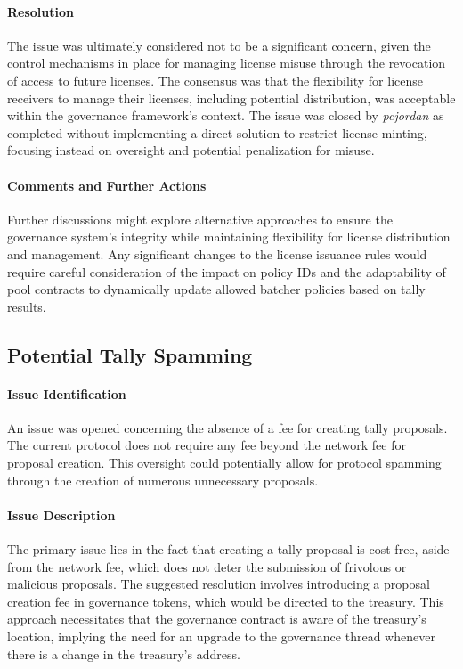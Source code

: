 \documentclass[11pt]{article}
\begin{document}
\paragraph{Resolution}
The issue was ultimately considered not to be a significant concern, given the control mechanisms in place for managing license misuse through the revocation of access to future licenses. The consensus was that the flexibility for license receivers to manage their licenses, including potential distribution, was acceptable within the governance framework's context. The issue was closed by \textit{pcjordan} as completed without implementing a direct solution to restrict license minting, focusing instead on oversight and potential penalization for misuse.

\paragraph{Comments and Further Actions}
Further discussions might explore alternative approaches to ensure the governance system's integrity while maintaining flexibility for license distribution and management. Any significant changes to the license issuance rules would require careful consideration of the impact on policy IDs and the adaptability of pool contracts to dynamically update allowed batcher policies based on tally results.


\subsection{Potential Tally Spamming}

\paragraph{Issue Identification}
An issue was opened concerning the absence of a fee for creating tally proposals.
The current protocol does not require any fee beyond the network fee for proposal creation.
This oversight could potentially allow for protocol spamming through the creation of numerous unnecessary proposals.

\paragraph{Issue Description}
The primary issue lies in the fact that creating a tally proposal is cost-free, aside from the network fee, which does not deter the submission of frivolous or malicious proposals.
The suggested resolution involves introducing a proposal creation fee in governance tokens, which would be directed to the treasury.
This approach necessitates that the governance contract is aware of the treasury's location, implying the need for an upgrade to the governance thread whenever there is a change in the treasury's address.
\end{document}
